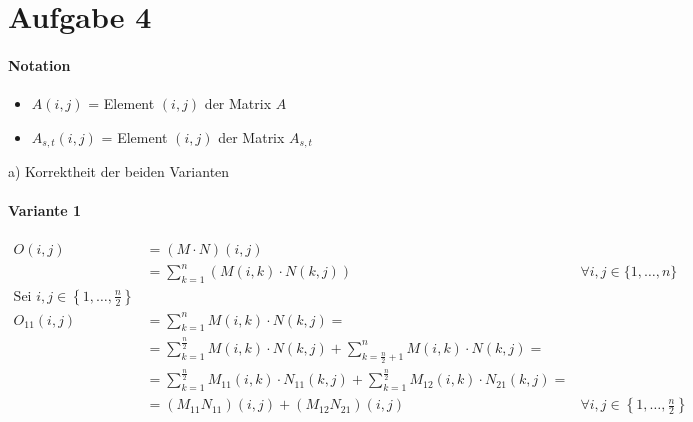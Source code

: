 \section*{Aufgabe 4}
\paragraph{Notation} 
\begin{itemize}[noitemsep]
	\item $A(i, j)$ = Element $(i, j)$ der Matrix $A$
    \item $A_{s, t}(i, j)$ = Element $(i, j)$ der Matrix $A_{s, t}$
\end{itemize}

a) Korrektheit der beiden Varianten
\paragraph{Variante 1}
\begin{align*}
	O(i, j) &= (M \cdot N)(i, j) \\
    &= \sum_{k = 1}^n \left( M(i, k) \cdot N(k, j) \right) & \forall i,j \in \{1, \dots, n\} \\[0.5cm]
    \text{Sei } i, j \in \left\{ 1, \dots, \frac{n}{2} \right\}& \\
    O_{11}(i, j) &= \sum_{k = 1}^n M(i, k) \cdot N(k, j) = \\
    &= \sum_{k = 1}^{\frac{n}{2}} M(i, k) \cdot N(k, j) + \sum_{k = \frac{n}{2} + 1}^n M(i, k) \cdot N(k, j) = \\
    &= \sum_{k = 1}^{\frac{n}{2}} M_{11}(i, k) \cdot N_{11}(k, j) + \sum_{k = 1}^{\frac{n}{2}} M_{12}(i, k) \cdot N_{21}(k, j) = \\
    &= (M_{11}N_{11})(i, j) + (M_{12}N_{21})(i, j) & \forall i, j \in \left\{ 1, \dots, \frac{n}{2} \right\}
\end{align*}

